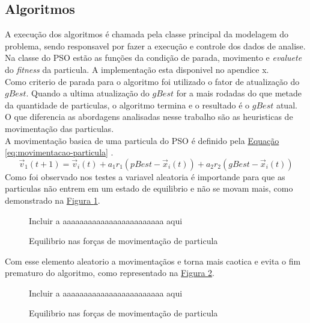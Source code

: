 \subsection{Algoritmos}
A execução dos algoritmos é chamada pela classe principal da modelagem do problema, sendo responsavel por fazer a execução e controle dos dados de analise.\\
Na classe do PSO estão as funções da condição de parada, movimento e \textit{evaluete} do \textit{fitness} da particula. A implementação esta disponivel no apendice x.\\ %
%
%
Como criterio de parada para o algoritmo foi utilizado o fator de atualização do $gBest$. Quando a ultima atualização do $gBest$ for a mais rodadas do que metade da quantidade de particulas, o algoritmo termina e o resultado é o $gBest$ atual.\\
\indent O que diferencia as abordagens analisadas nesse trabalho são as heuristicas de movimentação das particulas.\\
A movimentação basica de uma particula do PSO é definido pela
\hyperref[eq:movimentacao-particula]{Equação \ref{eq:movimentacao-particula}}
.
%
\begin{equation} 
    \label{eq:movimentacao-particula}
    \vec v_1(t+1)= \vec v_i(t) + a_1 r_1 (pBest - \vec x_i(t)) + a_2 r_2 (gBest - \vec x_i(t))
\end{equation}
%
Como foi observado nos testes a variavel aleatoria é importande para que as particulas não entrem em um estado de equilibrio e não se movam mais, como demonstrado na \hyperref[fig:equelibrio-particulas]{Figura \ref{fig:equelibrio-particulas}}.
\begin{figure}[ht]
    \centering
    \small{Incluir a aaaaaaaaaaaaaaaaaaaaaaaa aqui}
    \caption{Equilibrio nas forças de movimentação de particula}
    \label{fig:equelibrio-particulas}
\end{figure}

Com esse elemento aleatorio a movimentaçãos e torna mais caotica e evita o fim prematuro do algoritmo, como representado na \hyperref[fig:rand-particulas]{Figura \ref{fig:rand-particulas}}.
\begin{figure}[ht]
    \centering
    \small{Incluir a aaaaaaaaaaaaaaaaaaaaaaaa aqui}
    \caption{Equilibrio nas forças de movimentação de particula}
    \label{fig:rand-particulas}
\end{figure}

